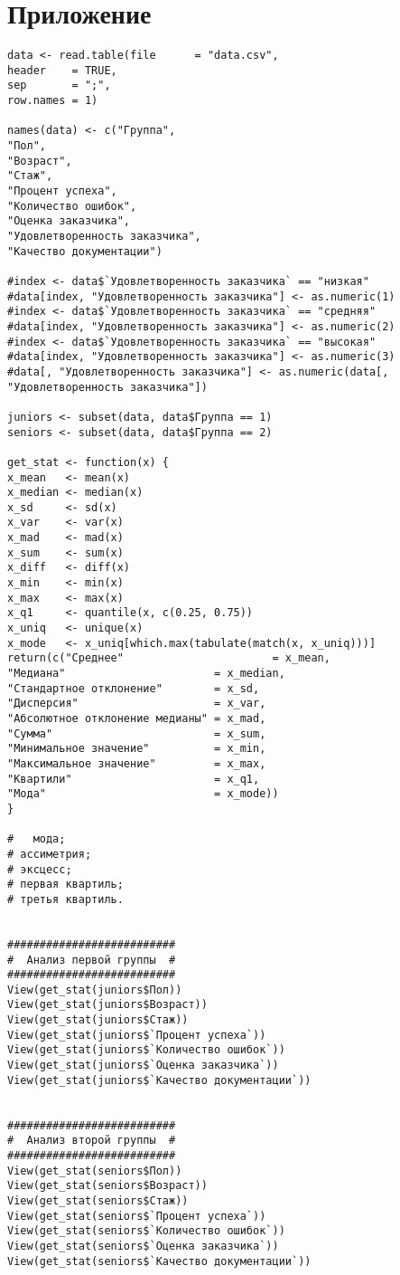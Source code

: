 \chapter*{Приложение}

\begin{verbatim}
data <- read.table(file      = "data.csv",
header    = TRUE,
sep       = ";",
row.names = 1)

names(data) <- c("Группа",
"Пол",
"Возраст",
"Стаж",
"Процент успеха",
"Количество ошибок",
"Оценка заказчика",
"Удовлетворенность заказчика",
"Качество документации")

#index <- data$`Удовлетворенность заказчика` == "низкая"
#data[index, "Удовлетворенность заказчика"] <- as.numeric(1)
#index <- data$`Удовлетворенность заказчика` == "средняя"
#data[index, "Удовлетворенность заказчика"] <- as.numeric(2)
#index <- data$`Удовлетворенность заказчика` == "высокая"
#data[index, "Удовлетворенность заказчика"] <- as.numeric(3)
#data[, "Удовлетворенность заказчика"] <- as.numeric(data[, "Удовлетворенность заказчика"])

juniors <- subset(data, data$Группа == 1)
seniors <- subset(data, data$Группа == 2)

get_stat <- function(x) {
x_mean   <- mean(x)
x_median <- median(x)
x_sd     <- sd(x)
x_var    <- var(x)
x_mad    <- mad(x)
x_sum    <- sum(x)
x_diff   <- diff(x)
x_min    <- min(x)
x_max    <- max(x)
x_q1     <- quantile(x, c(0.25, 0.75))
x_uniq   <- unique(x)
x_mode   <- x_uniq[which.max(tabulate(match(x, x_uniq)))]
return(c("Среднее"                       = x_mean,
"Медиана"                       = x_median,
"Стандартное отклонение"        = x_sd,
"Дисперсия"                     = x_var,
"Абсолютное отклонение медианы" = x_mad,
"Сумма"                         = x_sum,
"Минимальное значение"          = x_min,
"Максимальное значение"         = x_max,
"Квартили"                      = x_q1,
"Мода"                          = x_mode))
}

#	мода;
# ассиметрия;
# эксцесс;
# первая квартиль;
# третья квартиль.


##########################
#  Анализ первой группы  #
##########################
View(get_stat(juniors$Пол))
View(get_stat(juniors$Возраст))
View(get_stat(juniors$Стаж))
View(get_stat(juniors$`Процент успеха`))
View(get_stat(juniors$`Количество ошибок`))
View(get_stat(juniors$`Оценка заказчика`))
View(get_stat(juniors$`Качество документации`))


##########################
#  Анализ второй группы  #
##########################
View(get_stat(seniors$Пол))
View(get_stat(seniors$Возраст))
View(get_stat(seniors$Стаж))
View(get_stat(seniors$`Процент успеха`))
View(get_stat(seniors$`Количество ошибок`))
View(get_stat(seniors$`Оценка заказчика`))
View(get_stat(seniors$`Качество документации`))



\end{verbatim}
